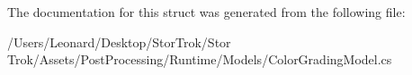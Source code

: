 The documentation for this struct was generated from the following file\+:\begin{DoxyCompactItemize}
\item 
/\+Users/\+Leonard/\+Desktop/\+Stor\+Trok/\+Stor Trok/\+Assets/\+Post\+Processing/\+Runtime/\+Models/Color\+Grading\+Model.\+cs\end{DoxyCompactItemize}
